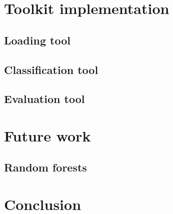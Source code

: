 \documentclass{article}
\begin{document}
  \section{Toolkit implementation}
    \subsection{Loading tool}
    \newpage
    \subsection{Classification tool}
    \newpage
    \subsection{Evaluation tool}
    \newpage
  \section{Future work}
    \subsection{Random forests}
    \newpage
  \section*{Conclusion}
\end{document}
